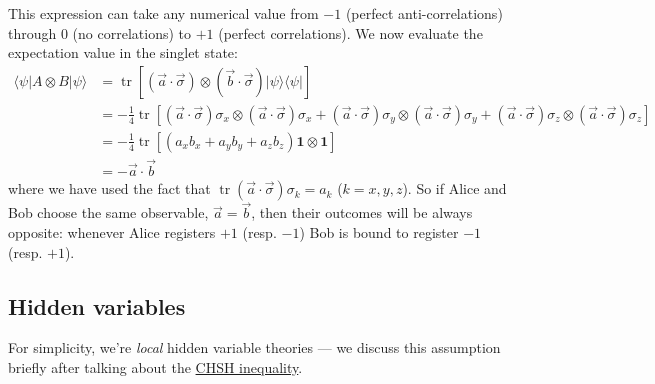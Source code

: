 \documentclass[fleqn]{article}
\begin{document}
This expression can take any numerical value from \(-1\) (perfect anti-correlations) through \(0\) (no correlations) to \(+1\) (perfect correlations).
We now evaluate the expectation value in the singlet state:
\[
\begin{aligned}
  \langle\psi|A\otimes B|\psi\rangle
  & = \operatorname{tr}\left[
      (\vec{a}\cdot\vec\sigma)\otimes(\vec{b}\cdot\vec\sigma) |\psi\rangle\langle\psi|
    \right]
\\& = -\frac{1}{4} \operatorname{tr}\left[
      (\vec{a}\cdot\vec\sigma)\sigma_x \otimes(\vec{a}\cdot\vec\sigma)\sigma_x
      + (\vec{a}\cdot\vec\sigma)\sigma_y \otimes(\vec{a}\cdot\vec\sigma)\sigma_y
      + (\vec{a}\cdot\vec\sigma)\sigma_z \otimes(\vec{a}\cdot\vec\sigma)\sigma_z
    \right]
\\& = -\frac{1}{4} \operatorname{tr}\left[
      (a_x b_x + a_y b_y + a_z b_z) \mathbf{1}\otimes\mathbf{1}
    \right]
\\& = -\vec{a}\cdot\vec{b}
\end{aligned}
\]
where we have used the fact that \(\operatorname{tr}(\vec{a}\cdot\vec\sigma)\sigma_k = a_k\) (\(k=x,y,z\)).
So if Alice and Bob choose the same observable, \(\vec{a} = \vec{b}\), then their outcomes will be always opposite: whenever Alice registers \(+1\) (resp. \(-1\)) Bob is bound to register \(-1\) (resp. \(+1\)).

\hypertarget{hidden-variables}{%
\subsection{Hidden variables}\label{hidden-variables}}

For simplicity, we're \emph{local} hidden variable theories --- we discuss this assumption briefly after talking about the \protect\hyperlink{chsh-inequality}{CHSH inequality}.
\end{document}
